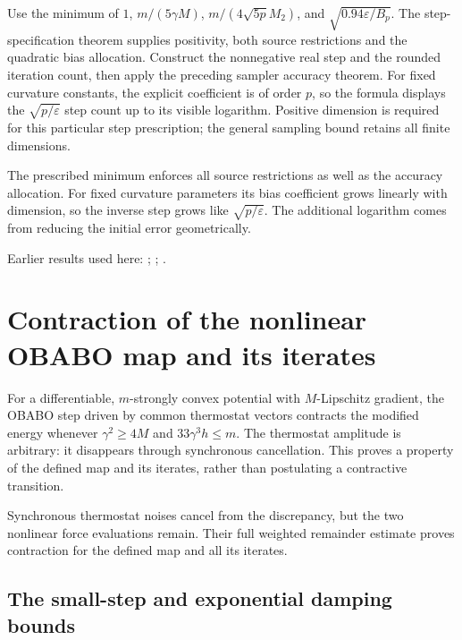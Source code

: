 \documentclass[11pt,a4paper]{report}
\begin{document}
Use the minimum of \(1\), \(m/(5\gamma M)\), \(m/(4\sqrt{5p}M_2)\), and \(\sqrt{0.94\varepsilon/B_p}\). The step-specification theorem supplies positivity, both source restrictions and the quadratic bias allocation. Construct the nonnegative real step and the rounded iteration count, then apply the preceding sampler accuracy theorem. For fixed curvature constants, the explicit coefficient is of order \(p\), so the formula displays the \(\sqrt{p/\varepsilon}\) step count up to its visible logarithm. Positive dimension is required for this particular step prescription; the general sampling bound retains all finite dimensions.



The prescribed minimum enforces all source restrictions as well as the accuracy allocation. For fixed curvature parameters its bias coefficient grows linearly with dimension, so the inverse step grows like \(\sqrt{p/\varepsilon}\). The additional logarithm comes from reducing the initial error geometrically.



Earlier results used here: \cite[Section~3.17.3]{LangevinLean2026ULASC}; \cite[Section~3.17.4]{LangevinLean2026ULASC}; \cite[Section~3.26.3]{LangevinLean2026ULASC}.
\section{\texorpdfstring{Contraction of the nonlinear OBABO map and its iterates}{Contraction of the nonlinear OBABO map and its iterates}}
\label{proof-module-KineticLangevin-OBABOContraction-lean}


For a differentiable, \(m\)-strongly convex potential with \(M\)-Lipschitz gradient, the OBABO step driven by common thermostat vectors contracts the modified energy whenever \(\gamma^2\ge4M\) and \(33\gamma^3h\le m\). The thermostat amplitude is arbitrary: it disappears through synchronous cancellation. This proves a property of the defined map and its iterates, rather than postulating a contractive transition.



Synchronous thermostat noises cancel from the discrepancy, but the two nonlinear force evaluations remain. Their full weighted remainder estimate proves contraction for the defined map and all its iterates.

\subsection{\texorpdfstring{The small-step and exponential damping bounds}{The small-step and exponential damping bounds}}
\label{report-step-KineticLangevin-OBABOContraction-lean-1}
\end{document}
